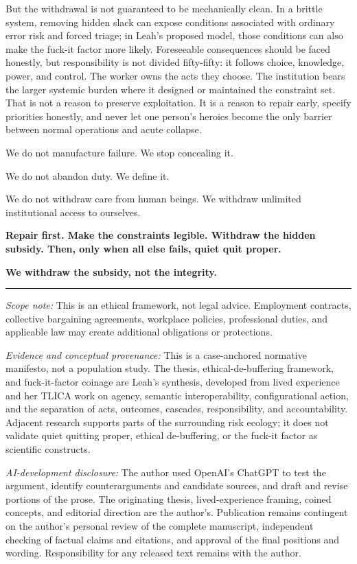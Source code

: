 \documentclass[11pt,oneside]{article}
\begin{document}
But the withdrawal is not guaranteed to be mechanically clean. In a
brittle system, removing hidden slack can expose conditions associated
with ordinary error risk and forced triage; in Leah's proposed model,
those conditions can also make the fuck-it factor more likely.
Foreseeable consequences should be faced honestly, but responsibility is
not divided fifty-fifty: it follows choice, knowledge, power, and
control. The worker owns the acts they choose. The institution bears the
larger systemic burden where it designed or maintained the constraint
set. That is not a reason to preserve exploitation. It is a reason to
repair early, specify priorities honestly, and never let one person's
heroics become the only barrier between normal operations and acute
collapse.

We do not manufacture failure. We stop concealing it.

We do not abandon duty. We define it.

We do not withdraw care from human beings. We withdraw unlimited
institutional access to ourselves.

\textbf{Repair first. Make the constraints legible. Withdraw the hidden
subsidy. Then, only when all else fails, quiet quit proper.}

\textbf{We withdraw the subsidy, not the integrity.}

\begin{center}\rule{0.5\linewidth}{0.5pt}\end{center}

\emph{Scope note:} This is an ethical framework, not legal advice.
Employment contracts, collective bargaining agreements, workplace
policies, professional duties, and applicable law may create additional
obligations or protections.

\emph{Evidence and conceptual provenance:} This is a case-anchored
normative manifesto, not a population study. The thesis,
ethical-de-buffering framework, and fuck-it-factor coinage are Leah's
synthesis, developed from lived experience and her TLICA work on agency,
semantic interoperability, configurational action, and the separation of
acts, outcomes, cascades, responsibility, and accountability. Adjacent
research supports parts of the surrounding risk ecology; it does not
validate quiet quitting proper, ethical de-buffering, or the fuck-it
factor as scientific constructs.

\emph{AI-development disclosure:} The author used OpenAI's ChatGPT to
test the argument, identify counterarguments and candidate sources, and
draft and revise portions of the prose. The originating thesis,
lived-experience framing, coined concepts, and editorial direction are
the author's. Publication remains contingent on the author's personal
review of the complete manuscript, independent checking of factual
claims and citations, and approval of the final positions and wording.
Responsibility for any released text remains with the author.

\clearpage
\begingroup
\sloppy
\footnotesize
\setlength{\parskip}{0.08em}
\theendnotes
\endgroup
\end{document}
